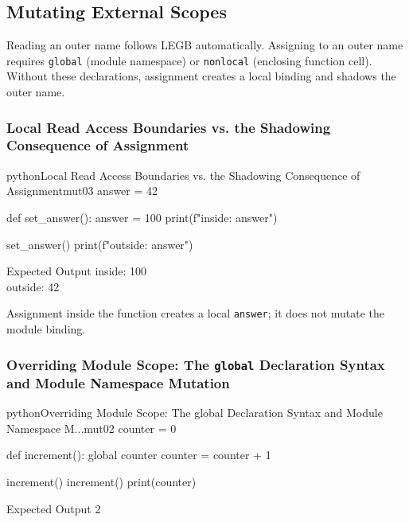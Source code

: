 \subsection{Mutating External Scopes}

Reading an outer name follows LEGB automatically. Assigning to an outer name requires \texttt{global} (module namespace) or \texttt{nonlocal} (enclosing function cell). Without these declarations, assignment creates a local binding and shadows the outer name.

\subsubsection{Local Read Access Boundaries vs. the Shadowing Consequence of Assignment}

\begin{codebox}[]{python}{Local Read Access Boundaries vs. the Shadowing Consequence of Assignment}{mut03}
answer = 42

def set_answer():
    answer = 100
    print(f"inside: {answer}")

set_answer()
print(f"outside: {answer}")
\end{codebox}


\begin{iobox}{Expected Output}
inside: 100 \\
outside: 42 \\
\end{iobox}




Assignment inside the function creates a local \texttt{answer}; it does not mutate the module binding.

\subsubsection{Overriding Module Scope: The \texttt{global} Declaration Syntax and Module Namespace Mutation}

\begin{codebox}[]{python}{Overriding Module Scope: The global Declaration Syntax and Module Namespace M...}{mut02}
counter = 0

def increment():
    global counter
    counter = counter + 1

increment()
increment()
print(counter)
\end{codebox}


\begin{iobox}{Expected Output}
2 \\
\end{iobox}




